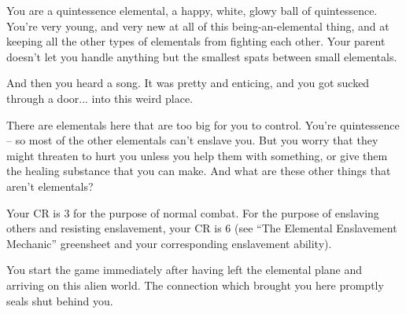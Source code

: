 \documentclass[char]{elementals}
\begin{document}
\name{\cNewQ{}}

You are a quintessence elemental, a happy, white, glowy ball of quintessence.  You're very young, and very new at all of this being-an-elemental thing, and at keeping all the other types of elementals from fighting each other.  Your parent doesn't let you handle anything but the smallest spats between small elementals.

And then you heard a song.  It was pretty and enticing, and you got sucked through a door... into this weird place.

There are elementals here that are too big for you to control.  You're quintessence -- so most of the other elementals can't enslave you.  But you worry that they might threaten to hurt you unless you help them with something, or give them the healing substance \iWhiteQ{} that you can make.  And what are these other things that aren't elementals?

Your CR is 3 for the purpose of normal combat. For the purpose of enslaving others and resisting enslavement, your CR is 6 (see ``The Elemental Enslavement Mechanic'' greensheet and your corresponding enslavement ability).

You start the game immediately after having left the elemental plane and arriving on this alien world. The connection which brought you here promptly seals shut behind you.
\end{document}
